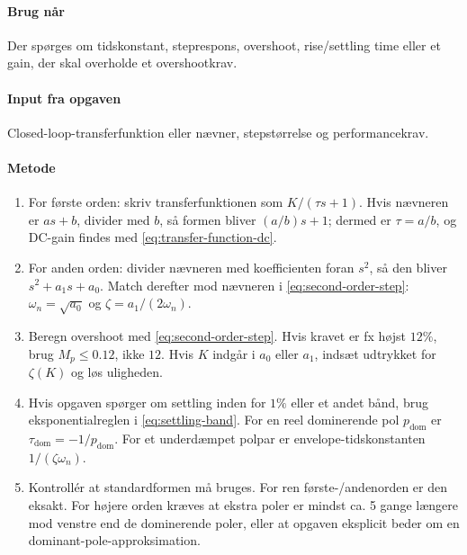 \paragraph{Brug når}
Der spørges om tidskonstant, steprespons, overshoot, rise/settling time eller et gain,
der skal overholde et overshootkrav.

\paragraph{Input fra opgaven}
Closed-loop-transferfunktion eller nævner, stepstørrelse og performancekrav.

\paragraph{Metode}
\begin{enumerate}
\item For første orden: skriv transferfunktionen som \(K/(\tau s+1)\). Hvis nævneren
      er \(as+b\), divider med \(b\), så formen bliver \((a/b)s+1\); dermed er
      \(\tau=a/b\), og DC-gain findes med \eqref{eq:transfer-function-dc}.
\item For anden orden: divider nævneren med koefficienten foran \(s^2\), så den bliver
      \(s^2+a_1s+a_0\). Match derefter mod nævneren i \eqref{eq:second-order-step}:
      \(\omega_n=\sqrt{a_0}\) og \(\zeta=a_1/(2\omega_n)\).
\item Beregn overshoot med \eqref{eq:second-order-step}. Hvis kravet er fx højst
      \(12\%\), brug \(M_p\leq0.12\), ikke \(12\). Hvis \(K\) indgår i \(a_0\) eller
      \(a_1\), indsæt udtrykket for \(\zeta(K)\) og løs uligheden.
\item Hvis opgaven spørger om settling inden for \(1\%\) eller et andet bånd, brug
      eksponentialreglen i \eqref{eq:settling-band}. For en reel dominerende pol
      \(p_{\mathrm{dom}}\) er \(\tau_{\mathrm{dom}}=-1/p_{\mathrm{dom}}\). For et
      underdæmpet polpar er envelope-tidskonstanten \(1/(\zeta\omega_n)\).
\item Kontrollér at standardformen må bruges. For ren første-/andenorden er den eksakt.
      For højere orden kræves at ekstra poler er mindst ca. 5 gange længere mod venstre
      end de dominerende poler, eller at opgaven eksplicit beder om en
      dominant-pole-approksimation.
\end{enumerate}

